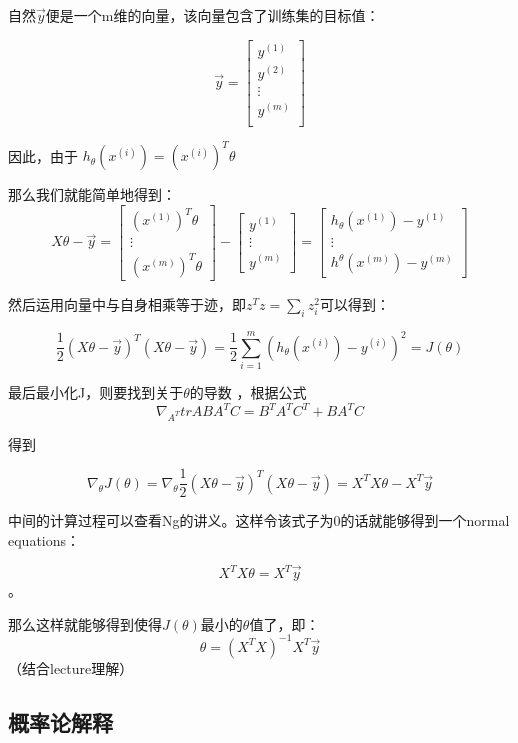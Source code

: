 \documentclass[UTF8]{ctexart}
\begin{document}
自然$\vec{y}$便是一个m维的向量，该向量包含了训练集的目标值： 

\[ \vec{y} = \begin{bmatrix}  y^{(1)}   \\ y^{(2)}  \\  \vdots  \\y^{(m)} \\ \end{bmatrix}   \]

因此，由于 $h_{\theta}(x^{(i)}) = (x^{(i)})^{T} \theta $

那么我们就能简单地得到：
\[    X\theta -  \vec{y} = \begin{bmatrix} (x^{(1)})^{T} \theta \\ \vdots \\ (x^{(m)})^{T} \theta  \end{bmatrix} - 
\begin{bmatrix} y^{(1)} \\  \vdots  \\y^{(m)} \end{bmatrix}  
= \begin{bmatrix}  h_{\theta}(x^{(1)}) - y^{(1)}  \\ \vdots \\h^{\theta}(x^{(m)}) - y^{(m)}   \end{bmatrix}
 \]
 
然后运用向量中与自身相乘等于迹，即$z^{T}z=\sum_{i}z_{i}^{2}$可以得到：

\[  \frac{1}{2} (X\theta-\vec{y})^{T}(X\theta-\vec{y}) = \frac{1}{2} \sum_{i=1}^{m} (h_{\theta}(x^{(i)}) - y^{(i)} )^{2}
 = J(\theta)
\]

 最后最小化J，则要找到关于$\theta$的导数 ，根据公式
\[  \nabla_{A^{T}}trABA^{T}C = B^{T} A^{T} C^{T}  + B A^{T} C \]

得到

\[  \nabla_{ \theta} J(\theta) = \nabla_{ \theta}\frac{1}{2} (X\theta-\vec{y})^{T}(X\theta-\vec{y}) = X^{T}X\theta - X^{T} 
\vec{y} \]

 中间的计算过程可以查看Ng的讲义。这样令该式子为0的话就能够得到一个normal equations：

 \[  X^{T}X\theta = X^{T}\vec{y} \]。 

 那么这样就能够得到使得$J(\theta)$最小的$\theta$值了，即：
 \[ \theta= (X^{T}X)^{-1} X^{T}  \vec{y} \]   （结合lecture理解）



\subsection{概率论解释}
\end{document}
